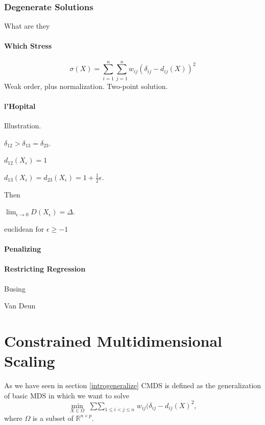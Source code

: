 \documentclass[
  12pt,
]{book}
\theoremstyle{definition}
\theoremstyle{definition}
\theoremstyle{definition}
\theoremstyle{definition}
\theoremstyle{remark}
\begin{document}
\hypertarget{unfdegenerate}{%
\subsection{Degenerate Solutions}\label{unfdegenerate}}

What are they

\hypertarget{which-stress}{%
\subsubsection{Which Stress}\label{which-stress}}

\[
\sigma(X)=\sum_{i=1}^n\sum_{j=1}^n w_{ij}(\delta_{ij}-d_{ij}(X))^2
\]
Weak order, plus normalization. Two-point solution.

\hypertarget{lhopital}{%
\subsubsection{l'Hopital}\label{lhopital}}

Illustration.

\(\delta_{12}>\delta_{13}=\delta_{23}\).

\(d_{12}(X_\epsilon)=1\)

\(d_{13}(X_\epsilon)=d_{23}(X_\epsilon)=1+\frac12\epsilon\).

Then

\(\lim_{\epsilon\rightarrow 0}D(X_\epsilon)=\Delta\).

euclidean for \(\epsilon\geq-1\)

\hypertarget{penalizing}{%
\subsubsection{Penalizing}\label{penalizing}}

\hypertarget{restricting-regression}{%
\subsubsection{Restricting Regression}\label{restricting-regression}}

Busing

Van Deun

\hypertarget{cmds}{%
\chapter{Constrained Multidimensional Scaling}\label{cmds}}

As we have seen in section \ref{introgeneralize} CMDS is defined as the generalization of basic MDS in which we want to solve
\[
\min_{X\in\Omega}\ \mathop{\sum\sum}_{1\leq i<j\leq n}w_{ij}(\delta_{ij}-d_{ij}(X)^2,
\]
where \(\Omega\) is a subset of \(\mathbb{R}^{n\times p}\).
\end{document}
